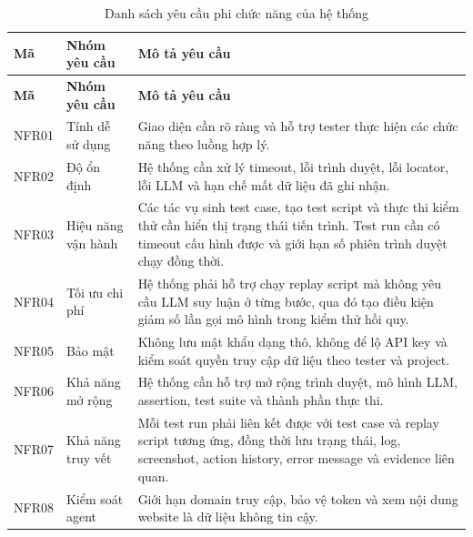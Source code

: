 {\small
\begin{longtable}{|p{1.6cm}|p{4.0cm}|p{8.8cm}|}
\caption{Danh sách yêu cầu phi chức năng của hệ thống}
\label{tab:nonfunctional_requirements} \\
\hline
\textbf{Mã} &
\textbf{Nhóm yêu cầu} &
\textbf{Mô tả yêu cầu} \\
\hline
\endfirsthead

\hline
\textbf{Mã} &
\textbf{Nhóm yêu cầu} &
\textbf{Mô tả yêu cầu} \\
\hline
\endhead

NFR01 &
Tính dễ sử dụng &
Giao diện cần rõ ràng và hỗ trợ tester thực hiện các chức năng theo luồng hợp lý. \\
\hline

NFR02 &
Độ ổn định &
Hệ thống cần xử lý timeout, lỗi trình duyệt, lỗi locator, lỗi LLM và hạn chế mất dữ liệu đã ghi nhận. \\
\hline

NFR03 &
Hiệu năng vận hành &
Các tác vụ sinh test case, tạo test script và thực thi kiểm thử cần hiển thị trạng thái tiến trình. Test run cần có timeout cấu hình được và giới hạn số phiên trình duyệt chạy đồng thời. \\
\hline

NFR04 &
Tối ưu chi phí &
Hệ thống phải hỗ trợ chạy replay script mà không yêu cầu LLM suy luận ở từng bước, qua đó tạo điều kiện giảm số lần gọi mô hình trong kiểm thử hồi quy. \\
\hline

NFR05 &
Bảo mật &
Không lưu mật khẩu dạng thô, không để lộ API key và kiểm soát quyền truy cập dữ liệu theo tester và project. \\
\hline

NFR06 &
Khả năng mở rộng &
Hệ thống cần hỗ trợ mở rộng trình duyệt, mô hình LLM, assertion, test suite và thành phần thực thi. \\
\hline

NFR07 &
Khả năng truy vết &
Mỗi test run phải liên kết được với test case và replay script tương ứng, đồng thời lưu trạng thái, log, screenshot, action history, error message và evidence liên quan. \\
\hline

NFR08 &
Kiểm soát agent &
Giới hạn domain truy cập, bảo vệ token và xem nội dung website là dữ liệu không tin cậy. \\
\hline

\end{longtable}
}

